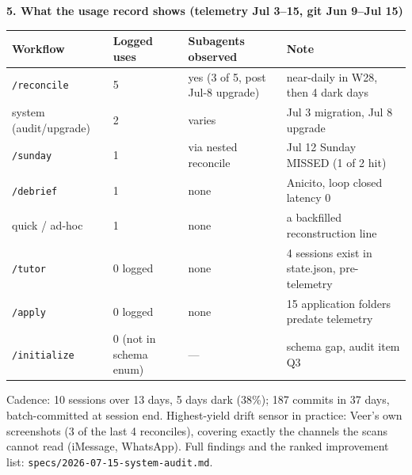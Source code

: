 \documentclass[11pt]{article}
\begin{document}
\vspace{6mm}
{\large\bfseries 5. What the usage record shows (telemetry Jul 3--15, git Jun 9--Jul 15)}

\vspace{3mm}
\begin{tabular}{@{}llll@{}}
\toprule
Workflow & Logged uses & Subagents observed & Note \\
\midrule
\texttt{/reconcile} & 5 & yes (3 of 5, post Jul-8 upgrade) & near-daily in W28, then 4 dark days \\
system (audit/upgrade) & 2 & varies & Jul 3 migration, Jul 8 upgrade \\
\texttt{/sunday} & 1 & via nested reconcile & Jul 12 Sunday MISSED (1 of 2 hit) \\
\texttt{/debrief} & 1 & none & Anicito, loop closed latency 0 \\
quick / ad-hoc & 1 & none & a backfilled reconstruction line \\
\texttt{/tutor} & 0 logged & none & 4 sessions exist in state.json, pre-telemetry \\
\texttt{/apply} & 0 logged & none & 15 application folders predate telemetry \\
\texttt{/initialize} & 0 (not in schema enum) & --- & schema gap, audit item Q3 \\
\bottomrule
\end{tabular}

\vspace{4mm}
Cadence: 10 sessions over 13 days, 5 days dark (38\%); 187 commits in 37 days, batch-committed at session end. Highest-yield drift sensor in practice: Veer's own screenshots (3 of the last 4 reconciles), covering exactly the channels the scans cannot read (iMessage, WhatsApp). Full findings and the ranked improvement list: \texttt{specs/2026-07-15-system-audit.md}.
\end{document}
